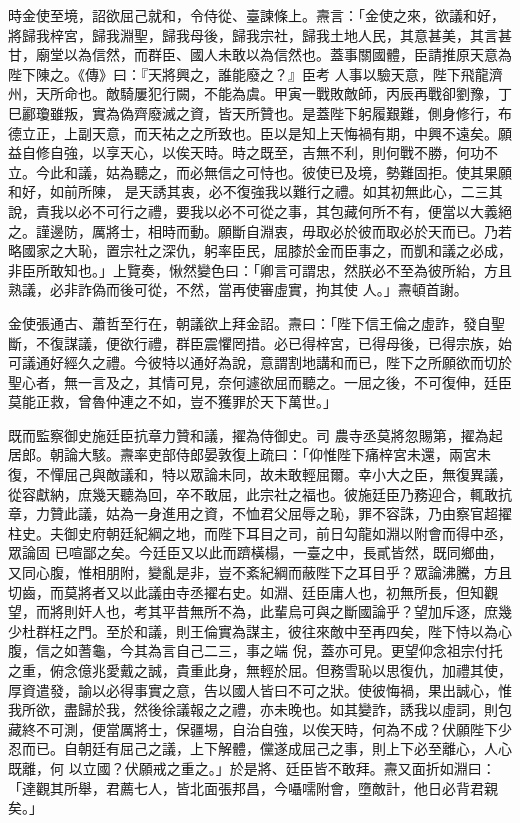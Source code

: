 \begin{pinyinscope}
 時金使至境，詔欲屈己就和，令侍從、臺諫條上。燾言：「金使之來，欲議和好，將歸我梓宮，歸我淵聖，歸我母後，歸我宗社，歸我土地人民，其意甚美，其言甚甘，廟堂以為信然，而群臣、國人未敢以為信然也。蓋事關國體，臣請推原天意為陛下陳之。《傳》曰：『天將興之，誰能廢之？』臣考
 人事以驗天意，陛下飛龍濟州，天所命也。敵騎屢犯行闕，不能為虞。甲寅一戰敗敵師，丙辰再戰卻劉豫，丁巳酈瓊雖叛，實為偽齊廢滅之資，皆天所贊也。是蓋陛下躬履艱難，側身修行，布德立正，上副天意，而天祐之之所致也。臣以是知上天悔禍有期，中興不遠矣。願益自修自強，以享天心，以俟天時。時之既至，吉無不利，則何戰不勝，何功不立。今此和議，姑為聽之，而必無信之可恃也。彼使已及境，勢難固拒。使其果願和好，如前所陳，
 是天誘其衷，必不復強我以難行之禮。如其初無此心，二三其說，責我以必不可行之禮，要我以必不可從之事，其包藏何所不有，便當以大義絕之。謹邊防，厲將士，相時而動。願斷自淵衷，毋取必於彼而取必於天而已。乃若略國家之大恥，置宗社之深仇，躬率臣民，屈膝於金而臣事之，而凱和議之必成，非臣所敢知也。」上覽奏，愀然變色曰：「卿言可謂忠，然朕必不至為彼所紿，方且熟議，必非詐偽而後可從，不然，當再使審虛實，拘其使
 人。」燾頓首謝。



 金使張通古、蕭哲至行在，朝議欲上拜金詔。燾曰：「陛下信王倫之虛詐，發自聖斷，不復謀議，便欲行禮，群臣震懼罔措。必已得梓宮，已得母後，已得宗族，始可議通好經久之禮。今彼特以通好為說，意謂割地講和而已，陛下之所願欲而切於聖心者，無一言及之，其情可見，奈何遽欲屈而聽之。一屈之後，不可復伸，廷臣莫能正救，曾魯仲連之不如，豈不獲罪於天下萬世。」



 既而監察御史施廷臣抗章力贊和議，擢為侍御史。司
 農寺丞莫將忽賜第，擢為起居郎。朝論大駭。燾率吏部侍郎晏敦復上疏曰：「仰惟陛下痛梓宮未還，兩宮未復，不憚屈己與敵議和，特以眾論未同，故未敢輕屈爾。幸小大之臣，無復異議，從容獻納，庶幾天聽為回，卒不敢屈，此宗社之福也。彼施廷臣乃務迎合，輒敢抗章，力贊此議，姑為一身進用之資，不恤君父屈辱之恥，罪不容誅，乃由察官超擢柱史。夫御史府朝廷紀綱之地，而陛下耳目之司，前日勾龍如淵以附會而得中丞，眾論固
 已喧鄙之矣。今廷臣又以此而躋橫榻，一臺之中，長貳皆然，既同鄉曲，又同心腹，惟相朋附，變亂是非，豈不紊紀綱而蔽陛下之耳目乎？眾論沸騰，方且切齒，而莫將者又以此議由寺丞擢右史。如淵、廷臣庸人也，初無所長，但知觀望，而將則奸人也，考其平昔無所不為，此輩烏可與之斷國論乎？望加斥逐，庶幾少杜群枉之門。至於和議，則王倫實為謀主，彼往來敵中至再四矣，陛下恃以為心腹，信之如蓍龜，今其為言自己二三，事之端
 倪，蓋亦可見。更望仰念祖宗付托之重，俯念億兆愛戴之誠，貴重此身，無輕於屈。但務雪恥以思復仇，加禮其使，厚資遣發，諭以必得事實之意，告以國人皆曰不可之狀。使彼悔禍，果出誠心，惟我所欲，盡歸於我，然後徐議報之之禮，亦未晚也。如其變詐，誘我以虛詞，則包藏終不可測，便當厲將士，保疆埸，自治自強，以俟天時，何為不成？伏願陛下少忍而已。自朝廷有屈己之議，上下解體，儻遂成屈己之事，則上下必至離心，人心既離，何
 以立國？伏願戒之重之。」於是將、廷臣皆不敢拜。燾又面折如淵曰：「達觀其所舉，君薦七人，皆北面張邦昌，今囁嚅附會，墮敵計，他日必背君親矣。」




\end{pinyinscope}

